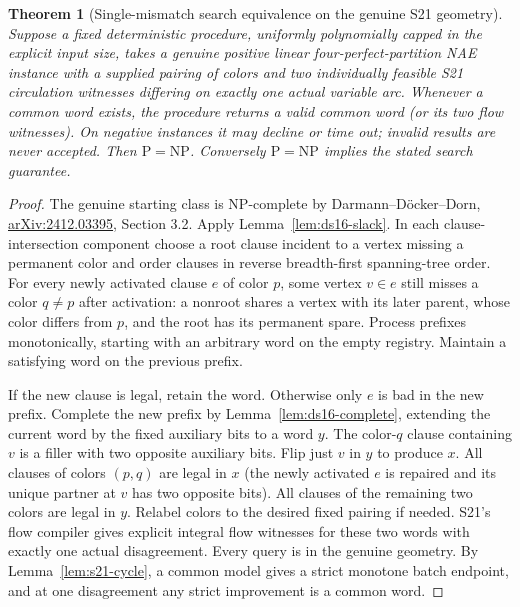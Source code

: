 \documentclass[11pt]{article}
\newtheorem{theorem}{Theorem}
\begin{document}
\begin{theorem}[Single-mismatch search equivalence on the genuine S21 geometry]\label{thm:ds16-one}
Suppose a fixed deterministic procedure, uniformly polynomially capped in the explicit input size, takes a genuine positive linear four-perfect-partition NAE instance with a supplied pairing of colors and two individually feasible S21 circulation witnesses differing on exactly one actual variable arc. Whenever a common word exists, the procedure returns a valid common word (or its two flow witnesses). On negative instances it may decline or time out; invalid results are never accepted. Then $\mathrm P=\mathrm{NP}$. Conversely $\mathrm P=\mathrm{NP}$ implies the stated search guarantee.
\end{theorem}
\begin{proof}
The genuine starting class is NP-complete by Darmann--D\"ocker--Dorn, \href{https://arxiv.org/abs/2412.03395}{arXiv:2412.03395}, Section 3.2. Apply Lemma~\ref{lem:ds16-slack}. In each clause-intersection component choose a root clause incident to a vertex missing a permanent color and order clauses in reverse breadth-first spanning-tree order. For every newly activated clause $e$ of color $p$, some vertex $v\in e$ still misses a color $q\ne p$ after activation: a nonroot shares a vertex with its later parent, whose color differs from $p$, and the root has its permanent spare. Process prefixes monotonically, starting with an arbitrary word on the empty registry. Maintain a satisfying word on the previous prefix.

If the new clause is legal, retain the word. Otherwise only $e$ is bad in the new prefix. Complete the new prefix by Lemma~\ref{lem:ds16-complete}, extending the current word by the fixed auxiliary bits to a word $y$. The color-$q$ clause containing $v$ is a filler with two opposite auxiliary bits. Flip just $v$ in $y$ to produce $x$. All clauses of colors $(p,q)$ are legal in $x$ (the newly activated $e$ is repaired and its unique partner at $v$ has two opposite bits). All clauses of the remaining two colors are legal in $y$. Relabel colors to the desired fixed pairing if needed. S21's flow compiler gives explicit integral flow witnesses for these two words with exactly one actual disagreement. Every query is in the genuine geometry. By Lemma~\ref{lem:s21-cycle}, a common model gives a strict monotone batch endpoint, and at one disagreement any strict improvement is a common word.


\end{proof}
\end{document}
